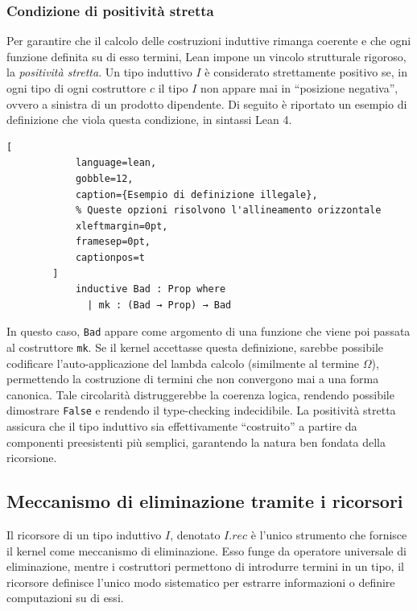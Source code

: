 \subsubsection{Condizione di positività stretta}
Per garantire che il calcolo delle costruzioni induttive rimanga coerente e che ogni funzione definita su di esso termini, Lean impone un vincolo 
strutturale rigoroso, la \emph{positività stretta}. Un tipo induttivo $I$ è considerato strettamente positivo se, in ogni tipo di ogni costruttore
$c$ il tipo $I$ non appare mai in ``posizione negativa'', ovvero a sinistra di un prodotto dipendente. Di seguito è riportato un esempio di definizione 
che viola questa condizione, in sintassi Lean 4.
\begin{center}
    \begin{minipage}{0.5\textwidth}
        \begin{lstlisting}[
            language=lean, 
            gobble=12,
            caption={Esempio di definizione illegale},
            % Queste opzioni risolvono l'allineamento orizzontale
            xleftmargin=0pt,
            framesep=0pt,
            captionpos=t
        ]
            inductive Bad : Prop where
              | mk : (Bad → Prop) → Bad
        \end{lstlisting}
    \end{minipage}
\end{center}
In questo caso, \texttt{Bad} appare come argomento di una funzione che viene poi passata al costruttore \texttt{mk}. Se il kernel accettasse questa definizione, 
sarebbe possibile codificare l'auto-applicazione del lambda calcolo (similmente al termine $\Omega$), permettendo la costruzione di termini che non convergono mai
a una forma canonica. Tale circolarità distruggerebbe la coerenza logica, rendendo possibile dimostrare \texttt{False} e rendendo il type-checking indecidibile. 
La positività stretta assicura che il tipo induttivo sia effettivamente ``costruito'' a partire da componenti preesistenti più semplici, garantendo la natura ben 
fondata della ricorsione.

\subsection{Meccanismo di eliminazione tramite i ricorsori}
Il ricorsore di un tipo induttivo $I$, denotato $I.rec$ è l'unico strumento che fornisce il kernel come meccanismo di eliminazione. Esso funge 
da operatore universale di eliminazione, mentre i costruttori permettono di introdurre termini in un tipo, il ricorsore definisce l'unico modo 
sistematico per estrarre informazioni o definire computazioni su di essi. 

